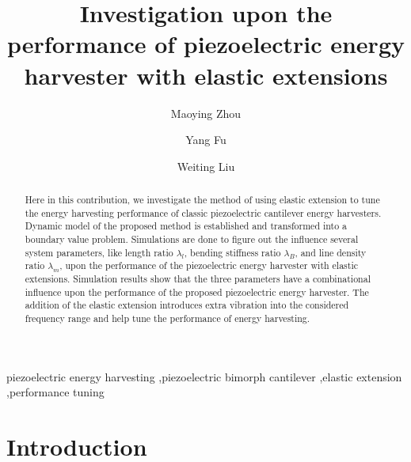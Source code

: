 \documentclass{elsarticle}
\begin{document}
\title{Investigation upon the performance of piezoelectric energy harvester with elastic extensions}
\author[1]{Maoying Zhou}
\author[2,3]{Yang Fu}
\author[3]{Weiting Liu}


\address[1]{School of Mechanical Engineering, Hangzhou Dianzi University, Hangzhou, China}
\address[2]{School of Automation and Mechanical Systems, Zhejiang University of Science and Technology, Hangzhou, China}
\address[3]{State Key Lab of Fluid Power and Mechanical Systems, Zhejiang University, Hangzhou, China}


\begin{abstract}

Here in this contribution, we investigate the method of using elastic extension to tune the energy harvesting performance of classic piezoelectric cantilever energy harvesters. Dynamic model of the proposed method is established and transformed into a boundary value problem. Simulations are done to figure out the influence several system parameters, like length ratio $\lambda_l$, bending stiffness ratio $\lambda_B$, and line density ratio $\lambda_m$, upon the performance of the piezoelectric energy harvester with elastic extensions. Simulation results show that the three parameters have a combinational influence upon the performance of the proposed piezoelectric energy harvester. The addition of the elastic extension introduces extra vibration into the considered frequency range and help tune the performance of energy harvesting. 

\end{abstract}

\begin{keyword}
piezoelectric energy harvesting \sep piezoelectric bimorph cantilever \sep elastic extension \sep performance tuning
\end{keyword}

\maketitle


\section{Introduction}
\end{document}
